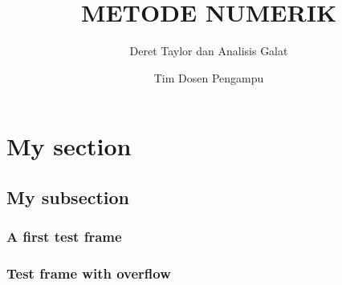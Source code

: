 \documentclass[pdflatex,compress,mathserif]{beamer}
\title{METODE NUMERIK}
\subtitle{Deret Taylor dan Analisis Galat}
\author{Tim Dosen Pengampu}
\begin{document}
\maketitle

\section{My section}
\subsection{My subsection}

\begin{frame}
\frametitle{A first test frame}
\lipsum[1]
\end{frame}

\begin{frame}
\frametitle{Test frame with overflow}
\lipsum%
\end{frame}


\end{document}
